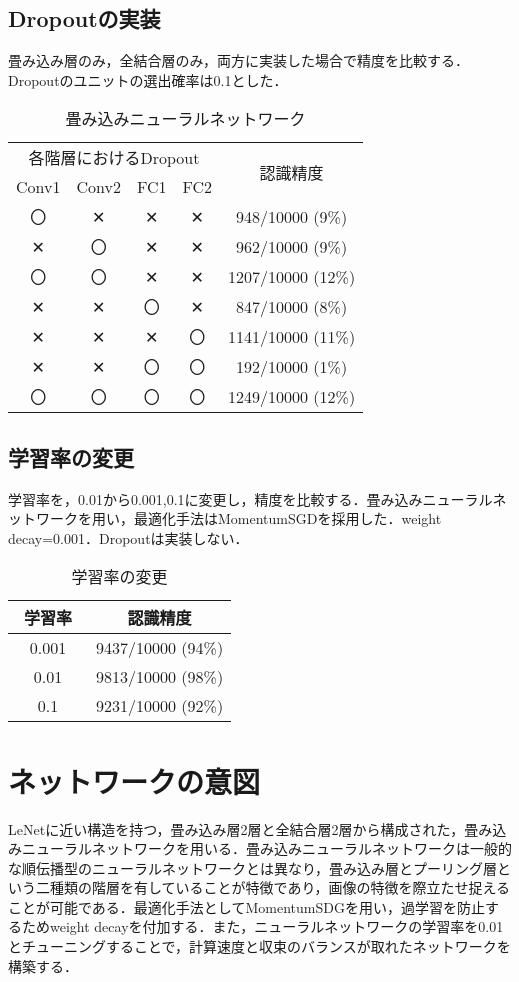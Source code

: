 \documentclass[a4paper, 12pt, dvipdfmx]{jarticle}
\begin{document}
\subsection{Dropoutの実装}
畳み込み層のみ，全結合層のみ，両方に実装した場合で精度を比較する．Dropoutのユニットの選出確率は0.1とした．
\begin{table}[htb]
  \centering
  \caption{畳み込みニューラルネットワーク}
  \begin{tabular}{cccc|c} \hline
    \multicolumn{4}{c}{各階層におけるDropout}　& \multirow{2}{*}{認識精度} \\
    Conv1 & Conv2 & FC1 & FC2 & \\ \hline
    〇 & ✕ & ✕ & ✕ & 948/10000 (9\%) \\
    ✕ & 〇 & ✕ & ✕ & 962/10000 (9\%) \\
    〇 & 〇 & ✕ & ✕ & 1207/10000 (12\%) \\
    ✕ & ✕ & 〇 & ✕ & 847/10000 (8\%) \\
    ✕ & ✕ & ✕ & 〇 &  1141/10000 (11\%) \\
    ✕ & ✕ & 〇 & 〇 &  192/10000 (1\%) \\
    〇 & 〇 & 〇 & 〇 & 1249/10000 (12\%)\\ \hline
  \end{tabular}
\end{table}

\subsection{学習率の変更}
学習率を，0.01から0.001,0.1に変更し，精度を比較する．畳み込みニューラルネットワークを用い，最適化手法はMomentumSGDを採用した．weight decay=0.001．Dropoutは実装しない．

\begin{table}[htb]
  \centering
  \caption{学習率の変更}
  \begin{tabular}{c|c} \hline
    学習率　& 認識精度 \\ \hline
    0.001 & 9437/10000 (94\%) \\
    0.01 & 9813/10000 (98\%) \\
    0.1 & 9231/10000 (92\%) \\ \hline
  \end{tabular}
\end{table}

\section{ネットワークの意図}
LeNetに近い構造を持つ，畳み込み層2層と全結合層2層から構成された，畳み込みニューラルネットワークを用いる．畳み込みニューラルネットワークは一般的な順伝播型のニューラルネットワークとは異なり，畳み込み層とプーリング層という二種類の階層を有していることが特徴であり，画像の特徴を際立たせ捉えることが可能である．最適化手法としてMomentumSDGを用い，過学習を防止するためweight decayを付加する．また，ニューラルネットワークの学習率を0.01とチューニングすることで，計算速度と収束のバランスが取れたネットワークを構築する．
\end{document}
